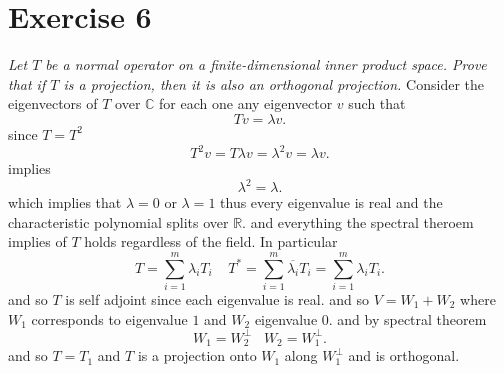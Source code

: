 \documentclass{article}
\begin{document}
        \section{Exercise 6}
        \emph{
            Let $T$ be a normal operator on a finite-dimensional inner product space. 
            Prove that if $T$ is a projection, then it is also an orthogonal projection.
        }
        Consider the eigenvectors of $T$ over $ \mathbb{C}$ for each one any eigenvector $v$ such that
        \[
        Tv = \lambda v
        .\] 
        since $T = T^2$
        \[
        T^2v = T\lambda v = \lambda^2 v = \lambda v
        .\] 
        implies
        \[
            \lambda^2 = \lambda
        .\] 
        which implies that $\lambda = 0$ or $\lambda = 1$ thus every eigenvalue is real and the characteristic polynomial splits over $ \mathbb{R}$.
        and everything the spectral theroem implies of $T$ holds regardless of the field.
        In particular
        \[
        T = \sum_{i=1}^{m}\lambda_iT_i \;\;\;\; T^{*} = \sum_{i=1}^{m}\overline{\lambda_i}T_i = \sum_{i=1}^{m}\lambda_iT_i
        .\] 
        and so $T$ is self adjoint  since each eigenvalue is real. and so
        $V = W_1 + W_2$ where $W_1 $ corresponds to eigenvalue $1$ and $W_2$ eigenvalue $0$.
        and by spectral theorem
        \[
        W_1 = W_2^{\perp} \;\;\; W_2 = W_1^{\perp}
        .\] 
        and so 
        $T = T_1$ 
        and $T$ is a projection onto $W_1$ along $W_1^{\perp}$ and is orthogonal.
\end{document}
